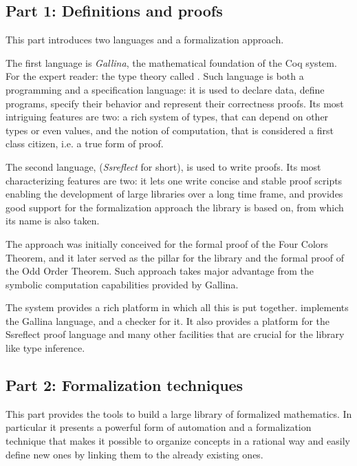 \subsection{Part 1: Definitions and proofs}

This part introduces two languages and a formalization approach.

The first language is \emph{Gallina}, the mathematical foundation of the Coq
system.  For the expert reader: the type theory called \mcbCIC{}.  Such
language is both a programming and a specification language: it is used to
declare data, define programs, specify their behavior and represent their
correctness proofs.  Its most intriguing features are two: a rich system of
types, that can depend on other types or even values, and the notion of
computation, that is considered a first class citizen, i.e. a true form of
proof.

The second language, \mcbSSR{} (\emph{Ssreflect} for short), is used to write
proofs.  Its most characterizing features are two: it lets one write
concise and stable proof scripts enabling the development of large
libraries over a long time frame, and provides good support for the
formalization approach the \mcbMC{} library is based on, from which
its name is also taken.

The \emph{\mcbSSR{}} approach was initially conceived for the formal proof
of the Four Colors Theorem, and it later served as the pillar for
the \mcbMC{} library and the formal proof of the Odd Order Theorem.
Such approach takes major advantage from the symbolic computation
capabilities provided by Gallina.

The \Coq{} system provides a rich platform in which all this is
put together.  \Coq{} implements the Gallina language, and a checker for it.
It also provides a platform for the Ssreflect proof language and
many other facilities that are crucial for the \mcbMC{} library like
type inference.

\subsection{Part 2: Formalization techniques}

This part provides the tools to build a large library of formalized
mathematics.  In particular it presents a powerful form of automation
and a formalization technique that makes it possible to organize
concepts in a rational way and easily define new ones by linking them
to the already existing ones.

